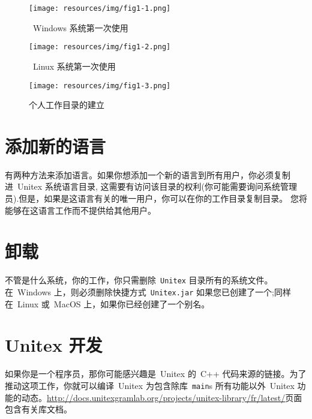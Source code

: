 \begin{figure}[h]
\begin{center}
\texttt{[image: resources/img/fig1-1.png]}
\caption{\ Windows 系统第一次使用}
\end{center}
\end{figure}

\begin{figure}[h]
\begin{center}
\texttt{[image: resources/img/fig1-2.png]}
\caption{\ Linux 系统第一次使用}
\end{center}
\end{figure}

\begin{figure}[h]
\begin{center}
\texttt{[image: resources/img/fig1-3.png]}
\caption{个人工作目录的建立
\label{fig-creation-personal-directory}}
\end{center}
\end{figure}



\section{添加新的语言}

\bigskip
\noindent 有两种方法来添加语言。如果你想添加一个新的语言到所有用户，你必须复制进\ Unitex 系统语言目录,
这需要有访问该目录的权利(你可能需要询问系统管理员).但是，如果是这语言有关的唯一用户，你可以在你的工作目录复制目录。 您将能够在这语言工作而不提供给其他用户。


\section{卸载}
不管是什么系统，你的工作，你只需删除\ \verb+Unitex+ 目录所有的系统文件。在\ Windows 上，则必须删除快捷方式\ \verb+Unitex.jar+   如果您已创建了一个;同样在\ Linux 或\ MacOS 上，如果你已经创建了一个别名。


\section{Unitex 开发}
\label{section-unitex-developpers}

如果你是一个程序员，那你可能感兴趣是\ Unitex 的\ C++ 代码来源的链接。为了推动这项工作，你就可以编译\ Unitex 为包含除库\ \verb+main+s 所有功能以外\ Unitex 功
能的动态。\url{http://docs.unitexgramlab.org/projects/unitex-library/fr/latest/}页面包含有关库文档。


